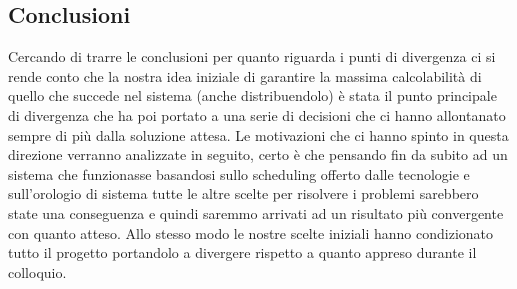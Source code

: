 \subsection{Conclusioni}
Cercando di trarre le conclusioni per quanto riguarda i punti di divergenza ci si rende conto che la nostra idea iniziale di garantire la massima calcolabilità di quello che succede nel sistema (anche distribuendolo) è stata il punto principale di divergenza che ha poi portato a una serie di decisioni che ci hanno allontanato sempre di più dalla soluzione attesa. Le motivazioni che ci hanno spinto in questa direzione verranno analizzate in seguito, certo è che pensando fin da subito ad un sistema che funzionasse basandosi sullo scheduling offerto dalle tecnologie e sull'orologio di sistema tutte le altre scelte per risolvere i problemi sarebbero state una conseguenza e quindi saremmo arrivati ad un risultato più convergente con quanto atteso. Allo stesso modo le nostre scelte iniziali hanno condizionato tutto il progetto portandolo a divergere rispetto a quanto appreso durante il colloquio.